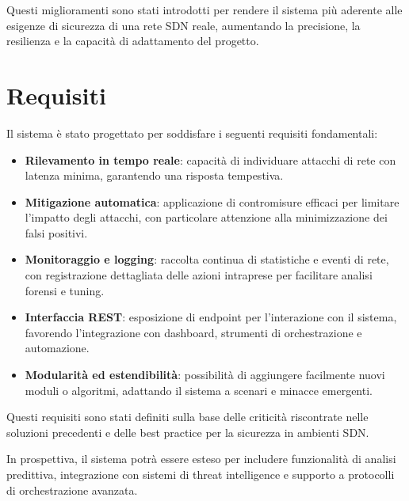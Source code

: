 Questi miglioramenti sono stati introdotti per rendere il sistema più aderente alle esigenze di sicurezza di una rete SDN reale, aumentando la precisione, la resilienza e la capacità di adattamento del progetto.

\section{Requisiti}
Il sistema è stato progettato per soddisfare i seguenti requisiti fondamentali:
\begin{itemize}
    \item \textbf{Rilevamento in tempo reale}: capacità di individuare attacchi di rete con latenza minima, garantendo una risposta tempestiva.
    \item \textbf{Mitigazione automatica}: applicazione di contromisure efficaci per limitare l’impatto degli attacchi, con particolare attenzione alla minimizzazione dei falsi positivi.
    \item \textbf{Monitoraggio e logging}: raccolta continua di statistiche e eventi di rete, con registrazione dettagliata delle azioni intraprese per facilitare analisi forensi e tuning.
    \item \textbf{Interfaccia REST}: esposizione di endpoint per l’interazione con il sistema, favorendo l’integrazione con dashboard, strumenti di orchestrazione e automazione.
    \item \textbf{Modularità ed estendibilità}: possibilità di aggiungere facilmente nuovi moduli o algoritmi, adattando il sistema a scenari e minacce emergenti.
\end{itemize}
Questi requisiti sono stati definiti sulla base delle criticità riscontrate nelle soluzioni precedenti e delle best practice per la sicurezza in ambienti SDN.\par
In prospettiva, il sistema potrà essere esteso per includere funzionalità di analisi predittiva, integrazione con sistemi di threat intelligence e supporto a protocolli di orchestrazione avanzata.

